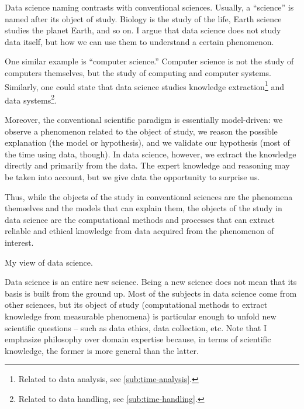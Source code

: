 Data science naming contrasts with conventional sciences.  Usually, a ``science'' is named after
its object of study.  Biology is the study of the life, Earth science studies the planet
Earth, and so on.  I argue that data science does not study data itself, but how we can
use them to understand a certain phenomenon.

One similar example is ``computer science.''  Computer science is not the study of
computers themselves, but the study of computing and computer systems.  Similarly, one
could state that data science studies knowledge extraction\footnote{Related to data
analysis, see \cref{sub:time-analysis}.} and data systems\footnote{Related to data
handling, see \cref{sub:time-handling}.}.

Moreover, the conventional scientific paradigm is
essentially model-driven: we observe a phenomenon related to the object of study, we
reason the possible explanation (the model or hypothesis), and we validate our hypothesis
(most of the time using data, though).  In data science, however, we extract the knowledge
directly and primarily from the data.  The expert knowledge and reasoning may be taken
into account, but we give data the opportunity to surprise us.

Thus, while the objects of the study in conventional sciences are the phenomena themselves
and the models that can explain them, the objects of the study in data
science are the computational methods and processes that can extract reliable and ethical
knowledge from data acquired from the phenomenon of interest.

\def\verrids{(0,0) circle (20mm)}
\def\verrist{(-2.5,0) circle (15mm)}
\def\verride {(2.5,0) circle (15mm)}
\def\verrics {(0,-2.5) circle (15mm)}

\begin{figurebox}[label=fig:myview]{My view of data science.}
  \centering
  \tcblower
    Data science is an entire new science.  Being a new science
    does not mean that its basis is built from the ground up.  Most of the subjects in
    data science come from other sciences, but its object of study (computational methods
    to extract knowledge from measurable phenomena) is particular enough to unfold
    new scientific questions -- such as data ethics, data collection, etc.
    Note that I emphasize philosophy over domain expertise because, in terms
    of scientific knowledge, the former is more general than the latter.
\end{figurebox}

